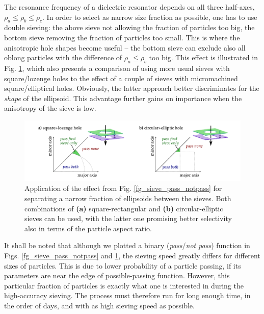 The resonance frequency of a dielectric resonator depends on all three half-axes, $\rho_a \leq \rho_b \leq \rho_c$. In order to select as narrow size fraction as possible, one has to use double sieving: the above sieve not allowing the fraction of particles too big, the bottom sieve removing the fraction of particles too small. This is where the anisotropic hole shapes become useful -- the bottom sieve can exclude also all oblong particles with the difference of $\rho_a \leq \rho_b$ too big. This effect is illustrated in Fig. \ref{fg_double_sieving}, which also presents a comparison of using more usual sieves with square/lozenge holes to the effect of a couple of sieves with micromachined square/elliptical holes. Obviously, the latter approach better discriminates for the \textit{shape} of the ellipsoid. This advantage further gains on importance when the anisotropy of the sieve is low.

\begin{figure}[ht] \caption{Application of the effect from Fig. \ref{fg_sieve_pass_notpass} for separating a narrow fraction of ellipsoids between the sieves. Both combinations of \textbf{(a)} square-rectangular and \textbf{(b)} circular-elliptic sieves can be used, with the latter one promising better selectivity also in terms of the particle aspect ratio.} \label{fg_double_sieving} \centering 
\includegraphics[width=\textwidth]{img/technology/sieve_double_sieving_fractions.pdf}
\end{figure}
It shall be noted that although we plotted a binary (\textit{pass}/\textit{not pass}) function in Figs. \ref{fg_sieve_pass_notpass} and \ref{fg_double_sieving}, the sieving speed greatly differs for different sizes of particles. This is due to lower probability of a particle passing, if its parameters are near the edge of possible-passing function. 
However, this particular fraction of particles is exactly what one is interested in during the high-accuracy sieving. The process must therefore run for long enough time, in the order of days, and with as high sieving speed as possible.
